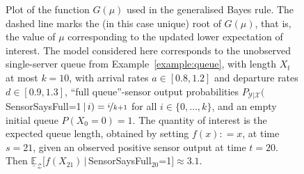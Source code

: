 \documentclass[3p]{elsarticle}
\newcommand{\states}{\mathcal{X}}
\newcommand{\observs}{\mathcal{Y}}
\newcommand{\coloneqq}{:\!=}
\begin{document}
\begin{figure}
\begin{center}
\end{center}
\caption{Plot of the function $G(\mu)$ used in the generalised Bayes rule. The dashed line marks the (in this case unique) root of $G(\mu)$, that is, the value of $\mu$ corresponding to the updated lower expectation of interest.
The model considered here corresponds to the unobserved single-server queue from Example~\ref{example:queue}, with length $X_t$ at most $k=10$, with arrival rates $a\in[0.8,1.2]$ and departure rates $d\in[0.9,1.3]$, ``full queue''-sensor output probabilities $P_{\observs\vert\states}($SensorSaysFull=1$\,\vert\,i)=\nicefrac{i}{k+1}$ for all $i\in\{0,\ldots,k\}$, and an empty initial queue $P(X_0=0)=1$. The quantity of interest is the expected queue length, obtained by setting $f(x)\coloneqq x$, at time $s=21$, given an observed positive sensor output at time $t=20$. Then $\underline{\mathbb{E}}_\mathcal{Z}[f(X_{21})\,\vert\,$SensorSaysFull${}_{20}$=1$]\approx 3.1$. }
\end{figure}\label{fig:gbr_example}
\end{document}
